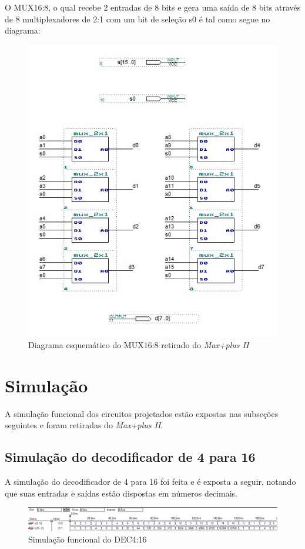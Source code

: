 \documentclass[a4paper]{article}
\begin{document}
	O MUX16:8, o qual recebe 2 entradas de 8 bits e gera uma saída de 8 bits através de 8 multiplexadores de 2:1 com um bit de seleção s0 é tal como segue no diagrama:
\begin{figure}[h]
  \centering
  \includegraphics[scale=0.73]{mux_16-8.jpg}
  \caption{Diagrama esquemático do MUX16:8 retirado do \emph{Max+plus II}}
\end{figure}



\FloatBarrier

\section{Simulação}

	A simulação funcional dos circuitos projetados estão expostas nas subseções seguintes e foram retiradas do \emph{Max+plus II}.

\subsection{Simulação do decodificador de 4 para 16}

	A simulação do decodificador de 4 para 16 foi feita e é exposta a seguir, notando que suas entradas e saídas estão dispostas em números decimais.
\begin{figure}[h]
  \centering
  \includegraphics[scale=0.46]{lab07_simulacao_decodificador.jpg}
  \caption{Simulação funcional do DEC4:16}
\end{figure}
\end{document}
